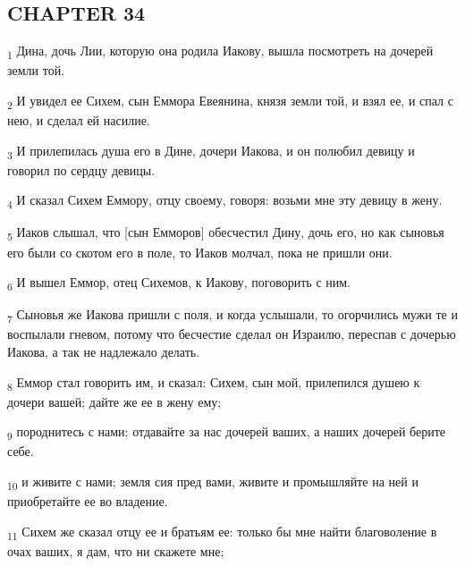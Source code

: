 \subsection{CHAPTER 34}
\begin{tcolorbox}
\textsubscript{1} Дина, дочь Лии, которую она родила Иакову, вышла посмотреть на дочерей земли той.
\end{tcolorbox}
\begin{tcolorbox}
\textsubscript{2} И увидел ее Сихем, сын Еммора Евеянина, князя земли той, и взял ее, и спал с нею, и сделал ей насилие.
\end{tcolorbox}
\begin{tcolorbox}
\textsubscript{3} И прилепилась душа его в Дине, дочери Иакова, и он полюбил девицу и говорил по сердцу девицы.
\end{tcolorbox}
\begin{tcolorbox}
\textsubscript{4} И сказал Сихем Еммору, отцу своему, говоря: возьми мне эту девицу в жену.
\end{tcolorbox}
\begin{tcolorbox}
\textsubscript{5} Иаков слышал, что [сын Емморов] обесчестил Дину, дочь его, но как сыновья его были со скотом его в поле, то Иаков молчал, пока не пришли они.
\end{tcolorbox}
\begin{tcolorbox}
\textsubscript{6} И вышел Еммор, отец Сихемов, к Иакову, поговорить с ним.
\end{tcolorbox}
\begin{tcolorbox}
\textsubscript{7} Сыновья же Иакова пришли с поля, и когда услышали, то огорчились мужи те и воспылали гневом, потому что бесчестие сделал он Израилю, переспав с дочерью Иакова, а так не надлежало делать.
\end{tcolorbox}
\begin{tcolorbox}
\textsubscript{8} Еммор стал говорить им, и сказал: Сихем, сын мой, прилепился душею к дочери вашей; дайте же ее в жену ему;
\end{tcolorbox}
\begin{tcolorbox}
\textsubscript{9} породнитесь с нами; отдавайте за нас дочерей ваших, а наших дочерей берите себе.
\end{tcolorbox}
\begin{tcolorbox}
\textsubscript{10} и живите с нами; земля сия пред вами, живите и промышляйте на ней и приобретайте ее во владение.
\end{tcolorbox}
\begin{tcolorbox}
\textsubscript{11} Сихем же сказал отцу ее и братьям ее: только бы мне найти благоволение в очах ваших, я дам, что ни скажете мне;
\end{tcolorbox}
